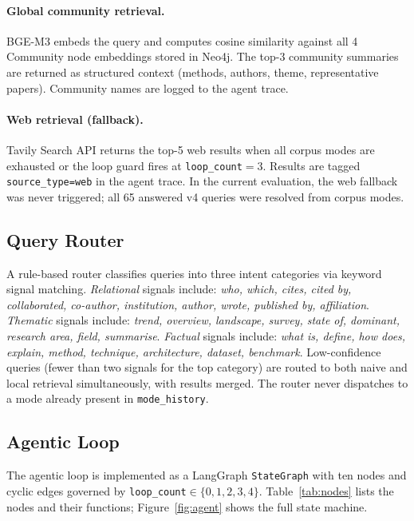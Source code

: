 \documentclass[11pt]{article}
\begin{document}
\paragraph{Global community retrieval.}
BGE-M3 embeds the query and computes cosine similarity against all 4
Community node embeddings stored in Neo4j. The top-3 community summaries
are returned as structured context (methods, authors, theme,
representative papers). Community names are logged to the agent trace.

\paragraph{Web retrieval (fallback).}
Tavily Search API returns the top-5 web results when all corpus modes are
exhausted or the loop guard fires at \texttt{loop\_count}$=3$. Results
are tagged \texttt{source\_type=web} in the agent trace. In the current
evaluation, the web fallback was never triggered; all 65 answered v4
queries were resolved from corpus modes.

\subsection{Query Router}
\label{subsec:router}

A rule-based router classifies queries into three intent categories via
keyword signal matching. \textit{Relational} signals include:
\textit{who, which, cites, cited by, collaborated, co-author,
institution, author, wrote, published by, affiliation}.
\textit{Thematic} signals include: \textit{trend, overview, landscape,
survey, state of, dominant, research area, field, summarise}.
\textit{Factual} signals include: \textit{what is, define, how does,
explain, method, technique, architecture, dataset, benchmark}.
Low-confidence queries (fewer than two signals for the top category) are
routed to both naive and local retrieval simultaneously, with results
merged. The router never dispatches to a mode already present in
\texttt{mode\_history}.

\subsection{Agentic Loop}
\label{subsec:agent}

The agentic loop is implemented as a LangGraph \texttt{StateGraph} with
ten nodes and cyclic edges governed by
\texttt{loop\_count}$\in\{0,1,2,3,4\}$. Table~\ref{tab:nodes} lists the
nodes and their functions; Figure~\ref{fig:agent} shows the full state
machine.
\end{document}
